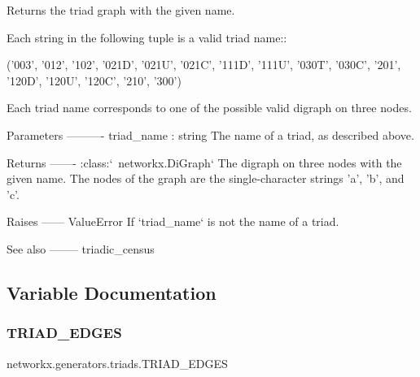 \begin{DoxyVerb}Returns the triad graph with the given name.

Each string in the following tuple is a valid triad name::

    ('003', '012', '102', '021D', '021U', '021C', '111D', '111U',
     '030T', '030C', '201', '120D', '120U', '120C', '210', '300')

Each triad name corresponds to one of the possible valid digraph on
three nodes.

Parameters
----------
triad_name : string
    The name of a triad, as described above.

Returns
-------
:class:`~networkx.DiGraph`
    The digraph on three nodes with the given name. The nodes of the
    graph are the single-character strings 'a', 'b', and 'c'.

Raises
------
ValueError
    If `triad_name` is not the name of a triad.

See also
--------
triadic_census\end{DoxyVerb}
 

\subsection{Variable Documentation}
\mbox{\label{namespacenetworkx_1_1generators_1_1triads_a3bda613f5c344e00102577b8ba824a29}} 
\subsubsection{\texorpdfstring{T\+R\+I\+A\+D\+\_\+\+E\+D\+G\+ES}{TRIAD\_EDGES}}
{\footnotesize\ttfamily networkx.\+generators.\+triads.\+T\+R\+I\+A\+D\+\_\+\+E\+D\+G\+ES}

